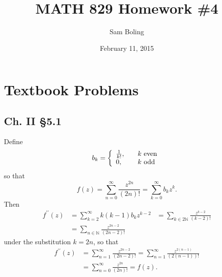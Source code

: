 \documentclass{article}
\title{MATH 829 Homework \#4}
\date{February 11, 2015}
\author{Sam Boling}
\newcounter{Problem}
\begin{document}
\begin{titlepage}
\maketitle
\end{titlepage}

\section{Textbook Problems}

\subsection*{Ch. II \S 5.1}
Define
$$
b_k
=
\left\{\begin{array}{l l}
  \frac{1}{k!}, & \quad k \text{ even} \\
  0,            & \quad k \text{ odd}
\end{array}\right.
$$
so that
$$
f(z) = \sum_{n=0}^{\infty} \frac{z^{2n}}{(2n)!} = \sum_{k=0}^\infty b_k z^k.
$$
Then
\begin{align*}
   f^{\prime\prime}(z)
&= \sum_{k=2}^\infty k (k-1) b_k z^{k-2}
&= \sum_{k \in 2\mathbb{N}} \frac{z^{k-2}}{(k-2)!} \\
&= \sum_{n \in \mathbb{N}} \frac{z^{2n - 2}}{(2n - 2)!}
\end{align*}
under the substitution $k = 2n$, so that
\begin{align*}
   f^{\prime\prime}(z)
&= \sum_{n=1}^\infty \frac{z^{2n - 2}}{(2n - 2)!}
 = \sum_{n=1}^\infty \frac{z^{2(n-1)}}{(2(n-1))!} \\
&= \sum_{n=0}^\infty \frac{z^{2n}}{(2n)!}
 = f(z).
\end{align*}
\end{document}
